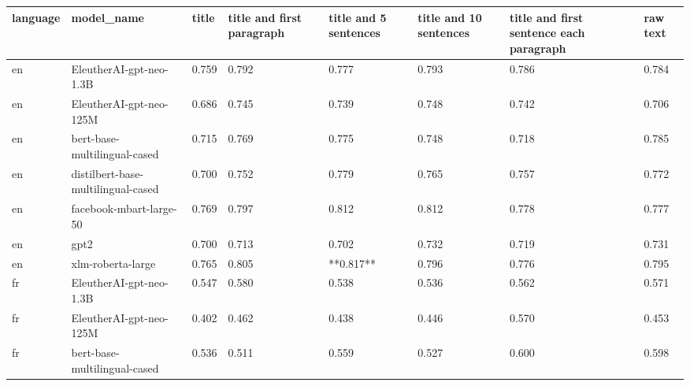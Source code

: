 \begin{tabular}{llllllll}
\toprule
language &                         model\_name &     title & title and first paragraph & title and 5 sentences & title and 10 sentences & title and first sentence each paragraph &  raw text \\
\midrule
      en &            EleutherAI-gpt-neo-1.3B &     0.759 &                     0.792 &                 0.777 &                  0.793 &                                   0.786 &     0.784 \\
      en &            EleutherAI-gpt-neo-125M &     0.686 &                     0.745 &                 0.739 &                  0.748 &                                   0.742 &     0.706 \\
      en &       bert-base-multilingual-cased &     0.715 &                     0.769 &                 0.775 &                  0.748 &                                   0.718 &     0.785 \\
      en & distilbert-base-multilingual-cased &     0.700 &                     0.752 &                 0.779 &                  0.765 &                                   0.757 &     0.772 \\
      en &            facebook-mbart-large-50 &     0.769 &                     0.797 &                 0.812 &                  0.812 &                                   0.778 &     0.777 \\
      en &                               gpt2 &     0.700 &                     0.713 &                 0.702 &                  0.732 &                                   0.719 &     0.731 \\
      en &                  xlm-roberta-large &     0.765 &                     0.805 &             **0.817** &                  0.796 &                                   0.776 &     0.795 \\
      fr &            EleutherAI-gpt-neo-1.3B &     0.547 &                     0.580 &                 0.538 &                  0.536 &                                   0.562 &     0.571 \\
      fr &            EleutherAI-gpt-neo-125M &     0.402 &                     0.462 &                 0.438 &                  0.446 &                                   0.570 &     0.453 \\
      fr &       bert-base-multilingual-cased &     0.536 &                     0.511 &                 0.559 &                  0.527 &                                   0.600 &     0.598 \\

\end{tabular}

